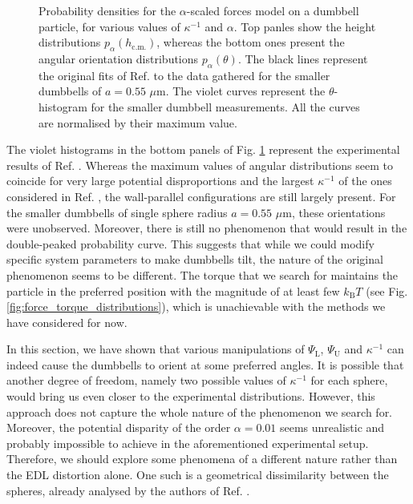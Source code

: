 \documentclass{master_thesis}
\begin{document}
\begin{figure}[h]
    \centering
    
    \caption{Probability densities for the $\alpha$-scaled forces model on a dumbbell particle, for various values of $\kappa^{-1}$ and $\alpha$. Top panles show the height distributions $p_{\alpha}(h_{\textrm{c.m.}})$, whereas the bottom ones present the angular orientation distributions $p_{\alpha}(\theta)$. The black lines represent the original fits of Ref. \cite{verweij2021} to the data gathered for the smaller dumbbells of $a=0.55$ $\mu$m. The violet curves represent the $\theta$-histogram for the smaller dumbbell measurements. All the curves are normalised by their maximum value.}
    \label{fig:different_sterns_and_kappas}
\end{figure}

The violet histograms in the bottom panels of Fig. \ref{fig:different_sterns_and_kappas} represent the experimental results of Ref. \cite{verweij2021}. Whereas the maximum values of angular distributions seem to coincide for very large potential disproportions and the largest $\kappa^{-1}$ of the ones considered in Ref. \cite{verweij2021}, the wall-parallel configurations are still largely present. For the smaller dumbbells of single sphere radius $a=0.55$ $\mu$m, these orientations were unobserved. Moreover, there is still no phenomenon that would result in the double-peaked probability curve. This suggests that while we could modify specific system parameters to make dumbbells tilt, the nature of the original phenomenon seems to be different. The torque that we search for maintains the particle in the preferred position with the magnitude of at least few $k_{\textrm{B}}T$ (see Fig. \ref{fig:force_torque_distributions}), which is unachievable with the methods we have considered for now. 

In this section, we have shown that various manipulations of $\Psi_{\textrm{L}}$, $\Psi_{\textrm{U}}$ and $\kappa^{-1}$ can indeed cause the dumbbells to orient at some preferred angles. It is possible that another degree of freedom, namely two possible values of $\kappa^{-1}$ for each sphere, would bring us even closer to the experimental distributions. However, this approach does not capture the whole nature of the phenomenon we search for. Moreover, the potential disparity of the order $\alpha=0.01$ seems unrealistic and probably impossible to achieve in the aforementioned experimental setup. Therefore, we should explore some phenomena of a different nature rather than the EDL distortion alone. One such is a geometrical dissimilarity between the spheres, already analysed by the authors of Ref. \cite{verweij2021}.
\end{document}
